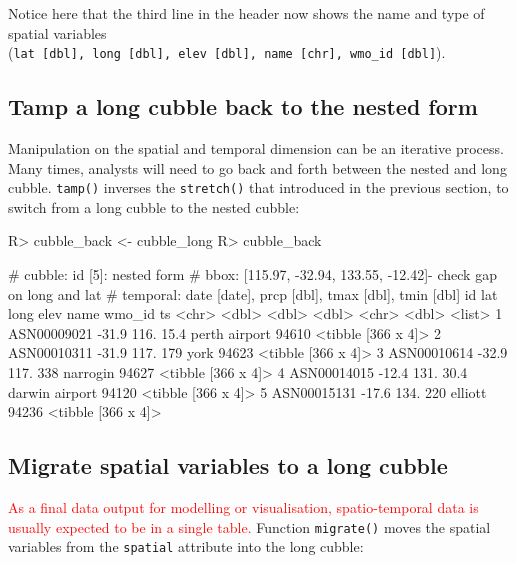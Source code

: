 \documentclass[
]{jss}
\begin{document}
Notice here that the third line in the header now shows the name and
type of spatial variables
(\texttt{lat\ {[}dbl{]},\ long\ {[}dbl{]},\ elev\ {[}dbl{]},\ name\ {[}chr{]},\ wmo\_id\ {[}dbl{]}}).

\hypertarget{tamp-a-long-cubble-back-to-the-nested-form}{%
\subsection{Tamp a long cubble back to the nested
form}\label{tamp-a-long-cubble-back-to-the-nested-form}}

Manipulation on the spatial and temporal dimension can be an iterative
process. Many times, analysts will need to go back and forth between the
nested and long cubble. \texttt{tamp()} inverses the \texttt{stretch()}
that introduced in the previous section, to switch from a long cubble to
the nested cubble:

\begin{CodeChunk}
\begin{CodeInput}
R> cubble_back <- cubble_long %
R> cubble_back
\end{CodeInput}
\begin{CodeOutput}
# cubble:   id [5]: nested form
# bbox:     [115.97, -32.94, 133.55, -12.42]- check gap on long and lat
# temporal: date [date], prcp [dbl], tmax [dbl], tmin [dbl]
  id            lat  long  elev name           wmo_id ts                
  <chr>       <dbl> <dbl> <dbl> <chr>           <dbl> <list>            
1 ASN00009021 -31.9  116.  15.4 perth airport   94610 <tibble [366 x 4]>
2 ASN00010311 -31.9  117. 179   york            94623 <tibble [366 x 4]>
3 ASN00010614 -32.9  117. 338   narrogin        94627 <tibble [366 x 4]>
4 ASN00014015 -12.4  131.  30.4 darwin airport  94120 <tibble [366 x 4]>
5 ASN00015131 -17.6  134. 220   elliott         94236 <tibble [366 x 4]>
\end{CodeOutput}
\end{CodeChunk}

\hypertarget{migrate-spatial-variables-to-a-long-cubble}{%
\subsection{Migrate spatial variables to a long
cubble}\label{migrate-spatial-variables-to-a-long-cubble}}

\textcolor{red}{As a final data output for modelling or visualisation, spatio-temporal data is usually expected to be in a single table.}
Function \texttt{migrate()} moves the spatial variables from the
\texttt{spatial} attribute into the long cubble:
\end{document}
